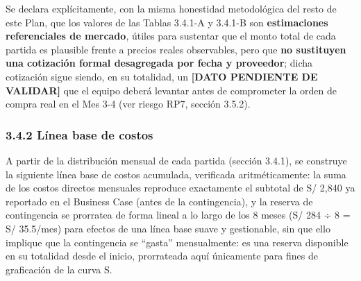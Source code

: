 \documentclass[11pt,a4paper]{article}
\begin{document}
Se declara explícitamente, con la misma honestidad metodológica del resto de este Plan, que los valores de las Tablas 3.4.1-A y 3.4.1-B son \textbf{estimaciones referenciales de mercado}, útiles para sustentar que el monto total de cada partida es plausible frente a precios reales observables, pero que \textbf{no sustituyen una cotización formal desagregada por fecha y proveedor}; dicha cotización sigue siendo, en su totalidad, un \textbf{{[}DATO PENDIENTE DE VALIDAR{]}} que el equipo deberá levantar antes de comprometer la orden de compra real en el Mes 3-4 (ver riesgo RP7, sección 3.5.2).

\subsubsection{3.4.2 Línea base de costos}\label{luxednea-base-de-costos}

A partir de la distribución mensual de cada partida (sección 3.4.1), se construye la siguiente línea base de costos acumulada, verificada aritméticamente: la suma de los costos directos mensuales reproduce exactamente el subtotal de S/ 2,840 ya reportado en el Business Case (antes de la contingencia), y la reserva de contingencia se prorratea de forma lineal a lo largo de los 8 meses (S/ 284 ÷ 8 = S/ 35.5/mes) para efectos de una línea base suave y gestionable, sin que ello implique que la contingencia se ``gasta'' mensualmente: es una reserva disponible en su totalidad desde el inicio, prorrateada aquí únicamente para fines de graficación de la curva S.
\end{document}
